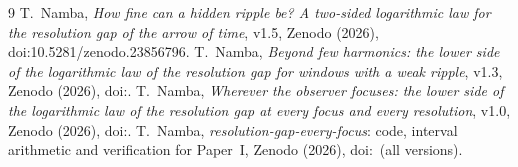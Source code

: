 \begin{thebibliography}{9}
 T.~Namba, \emph{How fine can a hidden ripple be? A two-sided logarithmic law for the resolution gap of the arrow of time}, v1.5, Zenodo (2026), doi:10.5281/zenodo.23856796.
 T.~Namba, \emph{Beyond few harmonics: the lower side of the logarithmic law of the resolution gap for windows with a weak ripple}, v1.3, Zenodo (2026), doi:\Hdoi.
 T.~Namba, \emph{Wherever the observer focuses: the lower side of the logarithmic law of the resolution gap at every focus and every resolution}, v1.0, Zenodo (2026), doi:\Idoi.
 T.~Namba, \emph{resolution-gap-every-focus}: code, interval arithmetic and verification for Paper~I, Zenodo (2026), doi:\Icodedoi\ (all versions).
\end{thebibliography}
